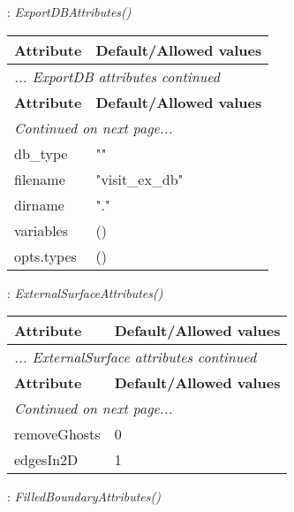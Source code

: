 \documentclass[10pt,a4paper]{report}
\begin{document}
\newpage

{}
: {\it ExportDBAttributes() }\\[-3mm]

\begin{longtable}{ll}
{\bf Attribute} & {\bf Default/Allowed values} \\
\hline \hline
\endfirsthead
\multicolumn{2}{l}{{\it ... ExportDB attributes continued}} \\
{\bf Attribute} & {\bf Default/Allowed values} \\
\hline \hline
\endhead
\hline
\multicolumn{2}{l}{{\it Continued on next page...}} \\
\endfoot
\hline
\endlastfoot

db\_type  &  "" \\
filename  &  "visit\_ex\_db" \\
dirname  &  "." \\
variables  &  () \\
opts.types  &  () \\
\end{longtable}

\newpage

{}
: {\it ExternalSurfaceAttributes() }\\[-3mm]

\begin{longtable}{ll}
{\bf Attribute} & {\bf Default/Allowed values} \\
\hline \hline
\endfirsthead
\multicolumn{2}{l}{{\it ... ExternalSurface attributes continued}} \\
{\bf Attribute} & {\bf Default/Allowed values} \\
\hline \hline
\endhead
\hline
\multicolumn{2}{l}{{\it Continued on next page...}} \\
\endfoot
\hline
\endlastfoot

removeGhosts  &  0 \\
edgesIn2D  &  1 \\
\end{longtable}

\newpage

{}
: {\it FilledBoundaryAttributes() }\\[-3mm]
\end{document}
